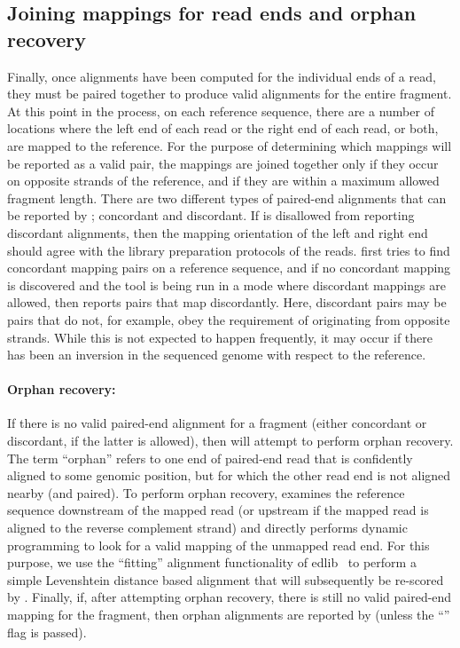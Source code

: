 \subsection{Joining mappings for read ends and orphan recovery}
\label{subsec:orphan_recovery}
Finally, once alignments have been computed for the individual ends
of a read, they must be paired together to produce valid alignments
for the entire fragment. At this point in the process, on each
reference sequence, there are a number of locations where the left
end of each read or the right end of each read, or both, are mapped 
to the reference. For the
purpose of determining which mappings will be reported as a valid
pair, the mappings are joined together only if they occur on opposite
strands of the reference, and if they are within a maximum allowed
fragment length. There are two different types of paired-end
alignments that can be reported by \puffaligner; concordant and
discordant. If \puffaligner is disallowed from reporting discordant
alignments, then the mapping orientation of the left and right end
should agree with the library preparation protocols of the reads.
\puffaligner first tries to find concordant mapping pairs on a
reference sequence, and if no concordant mapping is discovered and
the tool is being run in a mode where discordant mappings are
allowed, then \puffaligner reports pairs that map discordantly. Here,
discordant pairs may be pairs that do not, for example, obey the
requirement of originating from opposite strands. While this is not
expected to happen frequently, it may occur if there has been an
inversion in the sequenced genome with respect to the reference.

\paragraph{Orphan recovery: }  If there is no valid paired-end alignment for a fragment 
(either concordant or discordant, if the latter is allowed), then \puffaligner will attempt to 
perform orphan recovery. The term ``orphan'' refers to one end of paired-end read that is confidently 
aligned to some genomic position, but for which the other read end is not aligned nearby (and paired). 
To perform orphan recovery, \puffaligner examines the reference sequence downstream of the mapped read 
(or upstream if the mapped read is aligned to the reverse complement strand) and directly performs dynamic 
programming to look for a valid mapping of the unmapped read end. For this purpose, we use the ``fitting'' 
alignment functionality of edlib~\citep{edlib} to perform a simple Levenshtein distance based alignment that 
will subsequently be re-scored by \ksw. Finally, if, after attempting orphan recovery, there is still no valid 
paired-end mapping for the fragment, then orphan alignments are reported by \puffaligner (unless the 
``'' flag is passed).


